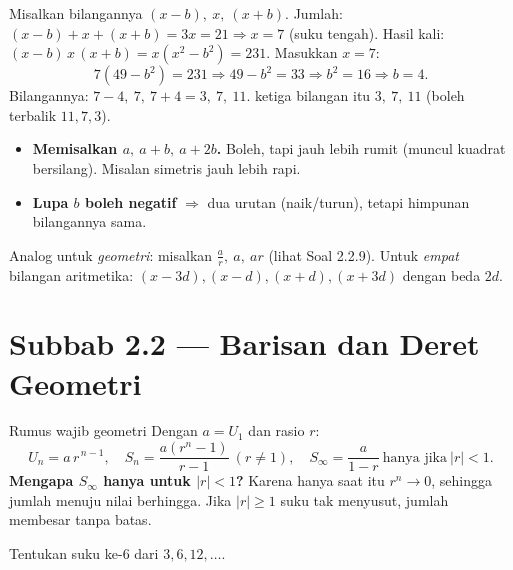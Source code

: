 \jawab
{} Misalkan bilangannya $(x-b),\ x,\ (x+b)$.
 Jumlah: $(x-b)+x+(x+b)=3x=21 \Rightarrow x=7$ (suku tengah).
 Hasil kali: $(x-b)\,x\,(x+b)=x(x^2-b^2)=231$. Masukkan $x=7$:
\[
7(49-b^2)=231 \Rightarrow 49-b^2=33 \Rightarrow b^2=16 \Rightarrow b=4.
\]
 Bilangannya: $7-4,\ 7,\ 7+4 = 3,\ 7,\ 11$.
\jadi ketiga bilangan itu $3,\ 7,\ 11$ (boleh terbalik $11,7,3$).

\begin{jebakan}
\begin{itemize}[leftmargin=*,topsep=2pt]
  \item \textbf{Memisalkan $a,\ a+b,\ a+2b$.} Boleh, tapi jauh lebih rumit
  (muncul kuadrat bersilang). Misalan simetris jauh lebih rapi.
  \item \textbf{Lupa $b$ boleh negatif} $\Rightarrow$ dua urutan (naik/turun),
  tetapi himpunan bilangannya sama.
\end{itemize}
\end{jebakan}

\begin{variasi}
Analog untuk \emph{geometri}: misalkan $\frac ar,\ a,\ ar$ (lihat Soal 2.2.9).
Untuk \emph{empat} bilangan aritmetika: $(x-3d),(x-d),(x+d),(x+3d)$ dengan beda
$2d$.
\end{variasi}

\section*{Subbab 2.2 — Barisan dan Deret Geometri}

\begin{ingat}{Rumus wajib geometri}
Dengan $a=U_1$ dan rasio $r$:
\[
U_n=a\,r^{\,n-1}, \quad S_n=\frac{a(r^n-1)}{r-1}\ (r\neq1), \quad
S_\infty=\frac{a}{1-r}\ \text{hanya jika}\ |r|<1.
\]
\textbf{Mengapa $S_\infty$ hanya untuk $|r|<1$?} Karena hanya saat itu
$r^n\to0$, sehingga jumlah menuju nilai berhingga. Jika $|r|\ge1$ suku tak
menyusut, jumlah membesar tanpa batas.
\end{ingat}

\begin{soalbox}{}
Tentukan suku ke-6 dari $3, 6, 12, \dots$.
\end{soalbox}

